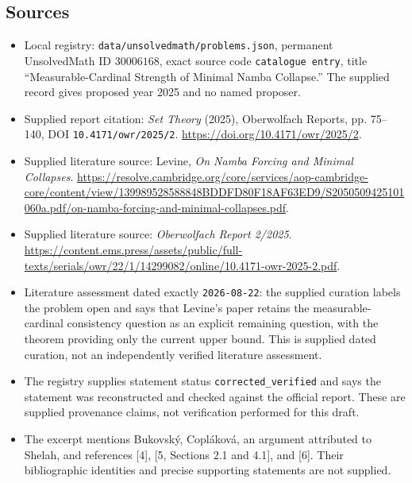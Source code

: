 \documentclass[11pt]{article}
\begin{document}
\subsection{Sources}
\begin{itemize}
\item Local registry: \texttt{data/unsolvedmath/problems.json}, permanent UnsolvedMath ID \(30006168\), exact source code \texttt{catalogue entry}, title ``Measurable-Cardinal Strength of Minimal Namba Collapse.'' The supplied record gives proposed year 2025 and no named proposer.
\item Supplied report citation: \emph{Set Theory} (2025), Oberwolfach Reports, pp. 75--140, DOI \texttt{10.4171/owr/2025/2}. \url{https://doi.org/10.4171/owr/2025/2}.
\item Supplied literature source: Levine, \emph{On Namba Forcing and Minimal Collapses}. \url{https://resolve.cambridge.org/core/services/aop-cambridge-core/content/view/139989528588848BDDFD80F18AF63ED9/S2050509425101060a.pdf/on-namba-forcing-and-minimal-collapses.pdf}.
\item Supplied literature source: \emph{Oberwolfach Report 2/2025}. \url{https://content.ems.press/assets/public/full-texts/serials/owr/22/1/14299082/online/10.4171-owr-2025-2.pdf}.
\item Literature assessment dated exactly \texttt{2026-08-22}: the supplied curation labels the problem open and says that Levine's paper retains the measurable-cardinal consistency question as an explicit remaining question, with the theorem providing only the current upper bound. This is supplied dated curation, not an independently verified literature assessment.
\item The registry supplies statement status \texttt{corrected\_verified} and says the statement was reconstructed and checked against the official report. These are supplied provenance claims, not verification performed for this draft.
\item The excerpt mentions Bukovsk\'{y}, Copl\'{a}kov\'{a}, an argument attributed to Shelah, and references [4], [5, Sections 2.1 and 4.1], and [6]. Their bibliographic identities and precise supporting statements are not supplied.
\end{itemize}
\end{document}
